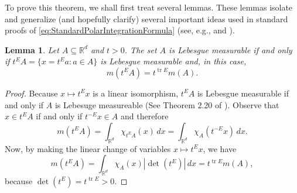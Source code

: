 \documentclass[11pt]{article}
\theoremstyle{theorem}
\newtheorem{lemma}[theorem]{Lemma}
\newcommand\tr{\operatorname{tr}}
\renewcommand\det{\operatorname{det}}
\begin{document}
\noindent To prove this theorem, we shall first treat several lemmas. These lemmas isolate and generalize (and hopefully clarify) several important ideas used in standard proofs of \eqref{eq:StandardPolarIntegrationFormula} (see, e.g., \cite{Folland1984} and \cite{Stein2005}). 

\begin{lemma}\label{lemma:Scaling}
Let $A\subseteq\mathbb{R}^d$ and $t>0$. The set $A$ is Lebesgue measurable if and only if $t^E A=\{x=t^E a:a\in A\}$ is Lebesgue measurable and, in this case,
\begin{equation*}
m(t^E A)=t^{\tr E}m(A).
\end{equation*}
\end{lemma}
\begin{proof}
Because $x\mapsto t^E x$ is a linear isomorphism, $t^E A$ is Lebesgue measurable if and only if $A$ is Lebesuge measureable (See Theorem 2.20 of \cite{Rudin1987}). Observe that $x\in t^E A$ if and only if $t^{-E}x\in A$ and therefore
\begin{equation*}
m(t^E A)=\int_{\mathbb{R}^d}\chi_{t^E A}(x)\,dx=\int_{\mathbb{R}^d}\chi_{A}(t^{-E}x)\,dx.
\end{equation*}
Now, by making the linear change of variables $x\mapsto t^E x$, we have
\begin{equation*}
m(t^E A)=\int_{\mathbb{R}^d}\chi_A(x)|\det(t^E)|\,dx=t^{\tr E}m(A),
\end{equation*}
because $\det(t^E)=t^{\tr E}>0$.
\end{proof}
\end{document}
